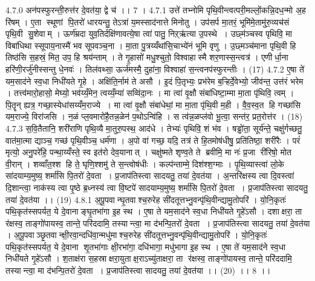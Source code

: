 4.7.0
अन॑पस्फुरन्ती॒रुत्त॑र दे॒वत॑या॒ द्वे च॑ ।। 7 ।
4.7.1
उत्ते॑ तभ्नोमि पृथि॒वीन्त्वत्परी॒मल्लों॒कन्नि॒दध॒न्मो अ॒ह रि॑षम् । ए॒ता स्थूणां पि॒तरो॑ धारयन्तु॒ तेऽत्रा॑ य॒मस्साद॑नात्ते मिनोतु । उप॑सर्प मा॒तरं॒ भूमि॑मे॒तामु॑रु॒व्यच॑सं पृथि॒वी सु॒शेवाम् । ऊर्ण॑म्रदा युव॒तिर्दक्षि॑णावत्ये॒षा त्वा॑ पातु॒ निऱ्ऋ॑त्या उ॒पस्थे । उछ्म॑ञ्चस्व पृथिवि॒ मा विबा॑धिथा स्सूपाय॒नास्मै॑ भव सूपवञ्च॒ना । मा॒ता पु॒त्रय्यँथा॑सि॒चाभ्ये॑नं भूमि वृणु । उ॒छ्मञ्च॑माना पृथि॒वी हि तिष्ठ॑सि स॒हस्रं॒ मित॒ उप॒ हि श्रय॑न्ताम् । ते गृ॒हासो॑ मधु॒श्चुतो॒ विश्वाहास्मै शर॒णास्स॒न्त्वत्र॑ । एणीर्धा॒ना हरि॑णी॒रर्जु॑नीस्सन्तु धे॒नवः॑ । तिल॑वथ्सा॒ ऊर्ज॑मस्मै॒ दुहा॑ना॒ विश्वाहा॑ स॒न्त्वनप॑स्फुरन्तीः । (17)
4.7.2
ए॒षा ते॑ यम॒साद॑ने स्व॒धा निधी॑यते गृ॒हे । अक्षि॑ति॒र्नाम॑ ते असौ । इ॒दं पि॒तृभ्यः॒ प्रभ॑रेम ब॒ऱ्हिर्दे॒वेभ्यो॒ जीव॑न्त॒ उत्त॑रं भरेम । तत्त्व॑मारो॒हासो॒ मेघ्यो॒ भव॑य्यँ॒मेन॒ त्वय्यँ॒म्या॑ सव्विंदा॒नः । मा त्वा॑ वृ॒क्षौ संबा॑धिष्टा॒म्मा मा॒ता पृ॑थिवि॒ त्वम् । पि॒तॄन् ह्यत्र॒ गच्छा॒स्येधा॑सय्यँम॒राज्ये । मा त्वा॑ वृ॒क्षौ संबा॑धेथां॒ मा मा॒ता पृ॑थि॒वी म॒ही । वै॒व॒स्व॒त हि गच्छा॑सि यम॒राज्ये॒ विरा॑जसि । न॒ळं प्ल॒वमारो॑है॒तन्न॒ळेन॑ प॒थोऽन्वि॑हि । स त्व॑न्न॒ळप्ल॑वो भू॒त्वा॒ सन्त॑र॒ प्रत॒रोत्त॑र । (18)
4.7.3
स॒वि॒तैतानि॒ शरी॑राणि पृथि॒व्यै मा॒तुरु॒पस्थ॒ आद॑धे । तेभ्यः॑ पृथिवि॒ शं भ॑व । षड्ढो॑ता॒ सूर्य॑न्ते॒ चक्षु॑र्गच्छतु॒ वात॑मा॒त्मा द्याञ्च॒ गच्छ॑ पृथि॒वीञ्च॒ धर्म॑णा । अ॒पो वा॑ गच्छ॒ यदि॒ तत्र॑ ते हि॒तमोष॑धीषु॒ प्रति॑तिष्ठा॒ शरी॑रैः । परं॑ मृत्यो॒ अनु॒परे॑हि॒ पन्था॒य्यँस्ते॒ स्व इत॑रो देव॒यानात् । चक्षु॑ष्मते शृण्व॒ते ते ब्रवीमि॒ मा नः॑ प्र॒जा री॑रिषो॒ मोत वी॒रान् । शव्वाँत॒श्श हि ते॒ घृणि॒श्शमु॑ ते स॒न्त्वोष॑धीः । कल्प॑न्ताम्मे॒ दिश॑श्श॒ग्माः । पृ॒थि॒व्यास्त्वा॑ लो॒के सा॑दयाम्य॒मुष्य॒ शर्मा॑सि पि॒तरो॑ दे॒वता । प्र॒जाप॑तिस्त्वा सादयतु॒ तया॑ दे॒वत॑या । अ॒न्तरि॑क्षस्य त्वा दि॒वस्त्वा॑ दि॒शान्त्वा॒ नाक॑स्य त्वा पृ॒ष्ठे ब्र॒ध्नस्य॑ त्वा वि॒ष्टपे॑ सादयाम्य॒मुष्य॒ शर्मा॑सि पि॒तरो॑ दे॒वता । प्र॒जाप॑तिस्त्वा सादयतु॒ तया॑ दे॒वत॑या ।। (19)
4.8.1
अ॒पू॒पवान्घृ॒तवाश्च॒रुरेह सी॑दतूत्तभ्नु॒वन्पृ॑थि॒वीन्द्यामु॒तोपरि॑ । यो॒नि॒कृतः॑ पथि॒कृत॑स्सपर्यत॒ ये दे॒वानाङ्घृ॒तभा॑गा इ॒ह स्थ । ए॒षा ते यम॒साद॑ने स्व॒धा निधी॑यते गृ॒हे॑ऽसौ । दशाक्षरा॒ ता र॑क्षस्व॒ ताङ्गो॑पायस्व॒ तान्ते॒ परि॑ददामि॒ तस्यान्त्वा॒ मा द॑भन्पि॒तरो॑ दे॒वता । प्र॒जाप॑तिस्त्वा सादयतु॒ तया॑ दे॒वत॑या । अ॒पू॒पवाञ्छृ॒तवान्क्षी॒रवा॒न्दधि॑वा॒न्मधु॑माश्च॒रुरेह सी॑दतूत्तभ्नु॒वन्पृ॑थि॒वीन्द्यामु॒तोपरि॑ । यो॒नि॒कृतः॑ पथि॒कृत॑स्सपर्यत॒ ये दे॒वाना शृ॒तभा॑गाः क्षी॒रभा॑गा॒ दधि॑भागा॒ मधु॑भागा इ॒ह स्थ । ए॒षा ते॑ यम॒साद॑ने स्व॒धा निधी॑यते गृ॒हे॑ऽसौ । श॒ताक्ष॑रा स॒हस्राक्षरा॒युताक्ष॒राऽच्यु॑ताक्षरा॒ ता र॑क्षस्व॒ ताङ्गो॑पायस्व॒ तान्ते॒ परि॑ददामि॒ तस्यान्त्वा॒ मा द॑भन्पि॒तरो॑ दे॒वता । प्र॒जाप॑तिस्त्वा सादयतु॒ तया॑ दे॒वत॑या ।। (20) ।। 8 ।।
\anuvakamend

